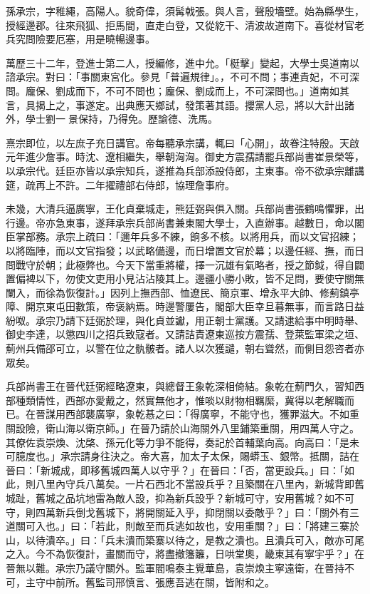 
\begin{pinyinscope}
孫承宗，字稚繩，高陽人。貌奇偉，須髯戟張。與人言，聲殷墻壁。始為縣學生，授經邊郡。往來飛狐、拒馬間，直走白登，又從紇干、清波故道南下。喜從材官老兵究問險要厄塞，用是曉暢邊事。

萬歷三十二年，登進士第二人，授編修，進中允。「梃擊」變起，大學士吳道南以諮承宗。對曰：「事關東宮化。參見「普遍規律」。，不可不問；事連貴妃，不可深問。龐保、劉成而下，不可不問也；龐保、劉成而上，不可深問也。」道南如其言，具揭上之，事遂定。出典應天鄉試，發策著其語。攖黨人忌，將以大計出諸外，學士劉一景保持，乃得免。歷諭德、洗馬。

熹宗即位，以左庶子充日講官。帝每聽承宗講，輒曰「心開」，故眷注特殷。天啟元年進少詹事。時沈、遼相繼失，舉朝洶洶。御史方震孺請罷兵部尚書崔景榮等，以承宗代。廷臣亦皆以承宗知兵，遂推為兵部添設侍郎，主東事。帝不欲承宗離講筵，疏再上不許。二年擢禮部右侍郎，協理詹事府。

未幾，大清兵逼廣寧，王化貞棄城走，熊廷弼與俱入關。兵部尚書張鶴鳴懼罪，出行邊。帝亦急東事，遂拜承宗兵部尚書兼東閣大學士，入直辦事。越數日，命以閣臣掌部務。承宗上疏曰：「邇年兵多不練，餉多不核。以將用兵，而以文官招練；以將臨陣，而以文官指發；以武略備邊，而日增置文官於幕；以邊任經、撫，而日問戰守於朝；此極弊也。今天下當重將權，擇一沉雄有氣略者，授之節鉞，得自闢置偏裨以下，勿使文吏用小見沾沾陵其上。邊疆小勝小敗，皆不足問，要使守關無闌入，而徐為恢復計。」因列上撫西部、恤遼民、簡京軍、增永平大帥、修薊鎮亭障、開京東屯田數策，帝褒納焉。時邊警屢告，閣部大臣幸旦暮無事，而言路日益紛呶。承宗乃請下廷弼於理，與化貞並讞，用正朝士黨護。又請逮給事中明時舉、御史李達，以懲四川之招兵致寇者。又請詰責遼東巡按方震孺、登萊監軍梁之垣、薊州兵備邵可立，以警在位之骫骳者。諸人以次獲譴，朝右聳然，而側目怨咨者亦眾矣。

兵部尚書王在晉代廷弼經略遼東，與總督王象乾深相倚結。象乾在薊門久，習知西部種類情性，西部亦愛戴之，然實無他才，惟啖以財物相羈縻，冀得以老解職而已。在晉謀用西部襲廣寧，象乾惎之曰：「得廣寧，不能守也，獲罪滋大。不如重關設險，衛山海以衛京師。」在晉乃請於山海關外八里鋪築重關，用四萬人守之。其僚佐袁崇煥、沈棨、孫元化等力爭不能得，奏記於首輔葉向高。向高曰：「是未可臆度也。」承宗請身往決之。帝大喜，加太子太保，賜蟒玉、銀幣。抵關，詰在晉曰：「新城成，即移舊城四萬人以守乎？」在晉曰：「否，當更設兵。」曰：「如此，則八里內守兵八萬矣。一片石西北不當設兵乎？且築關在八里內，新城背即舊城趾，舊城之品坑地雷為敵人設，抑為新兵設乎？新城可守，安用舊城？如不可守，則四萬新兵倒戈舊城下，將開關延入乎，抑閉關以委敵乎？」曰：「關外有三道關可入也。」曰：「若此，則敵至而兵逃如故也，安用重關？」曰：「將建三寨於山，以待潰卒。」曰：「兵未潰而築寨以待之，是教之潰也。且潰兵可入，敵亦可尾之入。今不為恢復計，畫關而守，將盡撤籓籬，日哄堂奧，畿東其有寧宇乎？」在晉無以難。承宗乃議守關外。監軍閻鳴泰主覺華島，袁崇煥主寧遠衛，在晉持不可，主守中前所。舊監司邢慎言、張應吾逃在關，皆附和之。


\end{pinyinscope}
